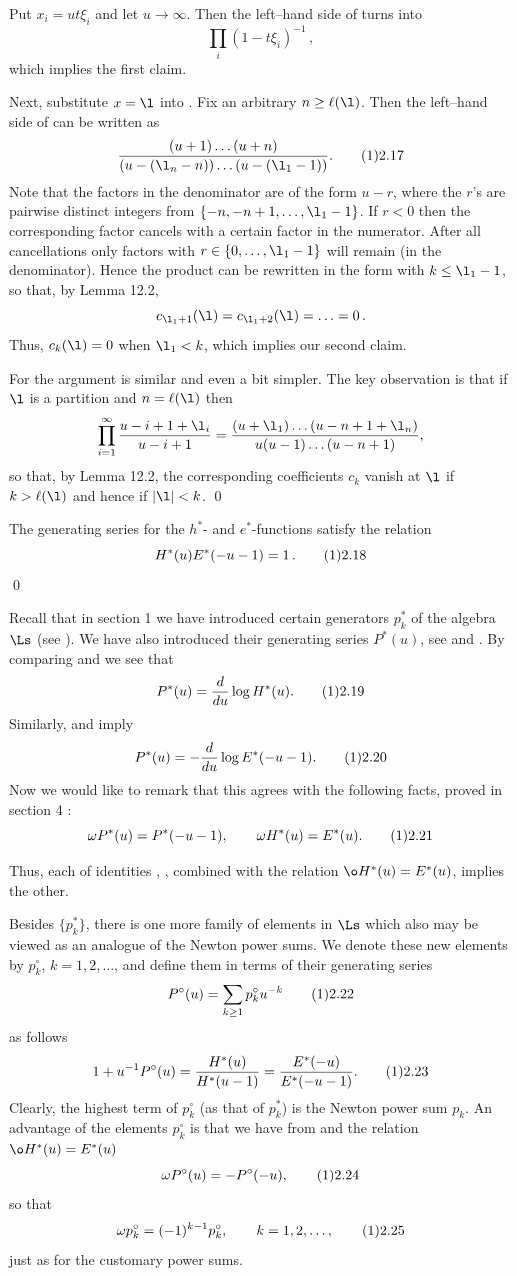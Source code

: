 Put $x_i=u t \xi_i$ and let $u\to\infty$. Then the 
left--hand side  of  turns into
$$
\prod_i (1-t\xi_i)^{-1} \,,
$$
which implies
the first claim.

Next, substitute $x=\l$ into . Fix an 
arbitrary $n\ge\ell(\l)$. Then
the left--hand side of  can be written as
$$
\frac{(u+1)\ldots(u+n)}
{(u-(\l_n-n))\ldots(u-(\l_1-1))}.\tag12.17
$$
Note that  the factors in the denominator are of the form $u-r$, where
the $r$'s are pairwise distinct integers from $\{-n,-n+1,\ldots,
\l_1-1\}$.  If $r<0$ then the corresponding factor cancels with a certain
factor in the numerator. After all cancellations only factors with
$r\in\{0,\ldots,\l_1-1\}$ will remain (in the denominator). Hence the
product  can be rewritten in the form  
with $k\le\l_1-1$, so
that, by Lemma 12.2, 
$$
c_{\l_1+1}(\l) = c_{\l_1+2}(\l) = \ldots = 0 \,.
$$
Thus, $c_k(\l)=0$ when $\l_1<k$, which implies our second claim.

For  the argument is similar and even a bit simpler. The key
observation is that if $\l$ is a partition and $n=\ell(\l)$ then
$$
\prod_{i=1}^\infty\frac{u-i+1+\l_i}{u-i+1}=
\frac{(u+\l_1)\ldots(u-n+1+\l_n)}
{u(u-1)\ldots(u-n+1)},
$$
so that, by Lemma 12.2, the corresponding coefficients $c_k$ vanish at
$\l$ if 
$k>\ell(\l)$ and hence if $|\l|<k$.
\qed
\enddemo

 The generating series for the $h^*$- and
$e^*$-functions satisfy the relation
$$
H^*(u) E^*(-u-1) = 1 \,. \tag12.18
$$
\qed
\endproclaim

Recall that in section 1 we have introduced certain generators $p^*_k$
of the algebra $\Ls$ (see ). We have also introduced their
generating series $P^*(u)$, see  and . By 
comparing  and  we see that
$$
P^*(u)=\frac{d}{du}\log H^*(u).\tag12.19
$$
Similarly,  and  imply 
$$
P^*(u)=-\frac{d}{du}\log E^*(-u-1).\tag12.20
$$
Now we would like to remark that this agrees with the following facts, 
proved in section 4 :
$$
\omega P^*(u)=P^*(-u-1),\qquad \omega H^*(u)=E^*(u).\tag12.21
$$

Thus, each of identities , , 
combined with the relation $\o H^*(u)=E^*(u)$, implies
the other. 

Besides $\{p^*_k\}$, there is one more family  of elements
in $\Ls$ which 
also may be viewed as an analogue of the Newton power sums. 
We denote these new elements by $p^\circ_k$, $k=1,2,\ldots$, and 
define them in terms of their generating series
$$
P^\circ(u)=\sum_{k\ge 1}p^\circ_k u^{-k}\tag12.22
$$
as follows
$$
1+u^{-1}P^\circ(u)=\frac{H^*(u)}{H^*(u-1)}=
\frac{E^*(-u)}{E^*(-u-1)}.\tag12.23
$$
Clearly, the highest term of $p^\circ_k$ (as that of $p^*_k$) is the
Newton power sum $p_k$. An advantage of the elements $p^\circ_k$  
is that we have from  and the relation $\o H^*(u)=E^*(u)$
$$
\omega P^\circ(u)=-P^\circ(-u),\tag12.24
$$
so that
$$
\omega p^\circ_k=(-1)^{k-1}p^\circ_k, \qquad k=1,2,\ldots,\tag12.25
$$
just as for the customary power sums.

